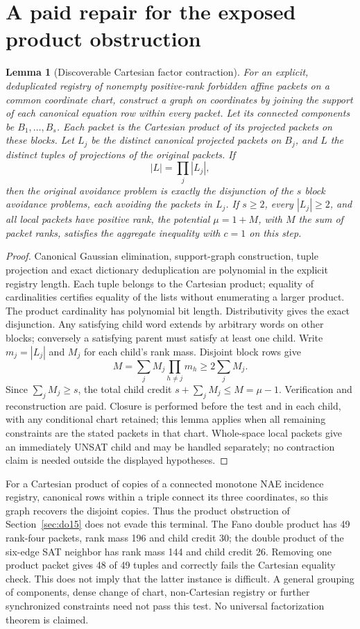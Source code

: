 \documentclass[11pt]{article}
\newtheorem{lemma}[theorem]{Lemma}
\begin{document}
\section{A paid repair for the exposed product obstruction}\label{sec:product-repair}
\begin{lemma}[Discoverable Cartesian factor contraction]\label{lem:cartesian}
For an explicit, deduplicated registry of nonempty positive-rank forbidden affine packets on a common coordinate chart, construct a graph on coordinates by joining the support of each canonical equation row within every packet. Let its connected components be $B_1,\ldots,B_s$. Each packet is the Cartesian product of its projected packets on these blocks. Let $L_j$ be the distinct canonical projected packets on $B_j$, and $L$ the distinct tuples of projections of the original packets. If
\[
|L|=\prod_j |L_j|,
\]
then the original avoidance problem is exactly the disjunction of the $s$ block avoidance problems, each avoiding the packets in $L_j$.
If $s\ge2$, every $|L_j|\ge2$, and all local packets have positive rank, the potential $\mu=1+M$, with $M$ the sum of packet ranks, satisfies the aggregate inequality with $c=1$ on this step.
\end{lemma}
\begin{proof}
Canonical Gaussian elimination, support-graph construction, tuple projection and exact dictionary deduplication are polynomial in the explicit registry length. Each tuple belongs to the Cartesian product; equality of cardinalities certifies equality of the lists without enumerating a larger product. The product cardinality has polynomial bit length. Distributivity gives the exact disjunction. Any satisfying child word extends by arbitrary words on other blocks; conversely a satisfying parent must satisfy at least one child. Write $m_j=|L_j|$ and $M_j$ for each child's rank mass. Disjoint block rows give
\[
M=\sum_j M_j\prod_{h\ne j}m_h\ge2\sum_j M_j.
\]
Since $\sum_j M_j\ge s$, the total child credit $s+\sum_j M_j\le M=\mu-1$. Verification and reconstruction are paid. Closure is performed before the test and in each child, with any conditional chart retained; this lemma applies when all remaining constraints are the stated packets in that chart. Whole-space local packets give an immediately UNSAT child and may be handled separately; no contraction claim is needed outside the displayed hypotheses.
\end{proof}
For a Cartesian product of copies of a connected monotone NAE incidence registry, canonical rows within a triple connect its three coordinates, so this graph recovers the disjoint copies. Thus the product obstruction of Section~\ref{sec:do15} does not evade this terminal. The Fano double product has 49 rank-four packets, rank mass 196 and child credit 30; the double product of the six-edge SAT neighbor has rank mass 144 and child credit 26. Removing one product packet gives 48 of 49 tuples and correctly fails the Cartesian equality check. This does not imply that the latter instance is difficult. A general grouping of components, dense change of chart, non-Cartesian registry or further synchronized constraints need not pass this test. No universal factorization theorem is claimed.
\end{document}
